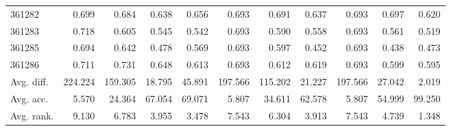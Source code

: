 \begin{tabular}{lrrrrrrrrrr}
361282 & 0.699 & 0.684 & 0.638 & 0.656 & 0.693 & 0.691 & 0.637 & 0.693 & 0.697 & 0.620 \\
361283 & 0.718 & 0.605 & 0.545 & 0.542 & 0.693 & 0.590 & 0.558 & 0.693 & 0.561 & 0.519 \\
361285 & 0.694 & 0.642 & 0.478 & 0.569 & 0.693 & 0.597 & 0.452 & 0.693 & 0.438 & 0.473 \\
361286 & 0.711 & 0.731 & 0.648 & 0.613 & 0.693 & 0.612 & 0.619 & 0.693 & 0.599 & 0.595 \\
Avg. diff. & 224.224 & 159.305 & 18.795 & 45.891 & 197.566 & 115.202 & 21.227 & 197.566 & 27.042 & 2.019 \\
Avg. acc. & 5.570 & 24.364 & 67.054 & 69.071 & 5.807 & 34.611 & 62.578 & 5.807 & 54.999 & 99.250 \\
Avg. rank. & 9.130 & 6.783 & 3.955 & 3.478 & 7.543 & 6.304 & 3.913 & 7.543 & 4.739 & 1.348 \\
\bottomrule
\end{tabular}
